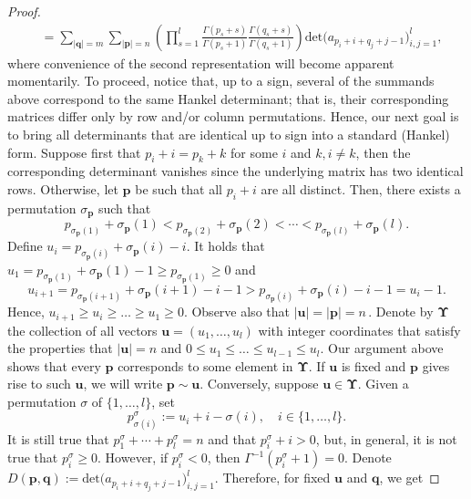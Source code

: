 \documentclass[10pt,a4paper]{amsart}
\def\ge{\geqslant}
\def\le{\leqslant}
\renewcommand{\det}{\mathrm{det}}
\begin{document}
\begin{proof}
\begin{align}
\label{wnm}
& = \sum_{|\boldsymbol q|=m}\sum_{|\boldsymbol p|=n} \left(\prod_{s=1}^l \frac{\Gamma(p_s+s)}{\Gamma(p_s+1)}\frac{\Gamma(q_s+s)}{\Gamma(q_s+1)}\right) \det\big(a_{p_i+i+q_j+j-1}\big)_{i,j=1}^l,
\end{align}
where convenience of the second representation will become apparent momentarily. To proceed,  notice that, up to a sign, several of the summands above correspond to the same Hankel determinant; that is, their corresponding matrices differ only by row and/or column permutations. Hence, our next goal is to bring all determinants that are identical up to sign into a standard (Hankel) form. Suppose first that \( p_i+i=p_k+k \) for some \( i \) and \( k, i\neq k \), then the corresponding determinant vanishes since the underlying matrix has two identical rows. Otherwise, let \( \boldsymbol p \) be such that all \( p_i+i \) are all distinct. Then, there exists a permutation \( \sigma_{\boldsymbol p} \) such that
\[
p_{\sigma_{\boldsymbol p}(1)}+\sigma_{\boldsymbol p}(1)<p_{\sigma_{\boldsymbol p}(2)}+\sigma_{\boldsymbol p}(2)< \cdots < p_{\sigma_{\boldsymbol p}(l)}+\sigma_{\boldsymbol p}(l).
\]
Define \( u_i = p_{\sigma_{\boldsymbol p}(i)}+\sigma_{\boldsymbol p}(i)-i \). It holds that \( u_1 = p_{\sigma_{\boldsymbol p}(1)}+\sigma_{\boldsymbol p}(1)-1\geq p_{\sigma_{\boldsymbol p}(1)} \geq 0 \) and
\[
u_{i+1} = p_{\sigma_{\boldsymbol p}(i+1)}+\sigma_{\boldsymbol p}(i+1)-i - 1 > p_{\sigma_{\boldsymbol p}(i)}+\sigma_{\boldsymbol p}(i)-i -1 = u_i - 1.
\]
Hence, \( u_{i+1}\geq u_i\geq \ldots \ge u_1\geq 0 \). Observe also that
$
|\boldsymbol u|=|\boldsymbol p|=n\,.
$
Denote by $\boldsymbol \Upsilon$ the collection of all vectors $\boldsymbol u=(u_1,\ldots,u_l)$ with integer coordinates that satisfy the properties that $|\boldsymbol u|=n$ and {$0\le u_1\le \ldots \le u_{l-1}\le u_{l}$.} Our argument above shows that every $\boldsymbol p$ corresponds to some element in $\boldsymbol \Upsilon$. If $\boldsymbol u$ is fixed and $\boldsymbol p$ gives rise to such $\boldsymbol u$, we will write 
\( \boldsymbol p\sim \boldsymbol u \). Conversely, suppose \( \boldsymbol u \in \boldsymbol \Upsilon\). Given a permutation \( \sigma \) of \( \{1,\ldots,l\} \), set
\[
p_{\sigma(i)}^\sigma := u_i+i-\sigma(i), \quad i\in\{1,\ldots,l\}.
\]
It is still true that \( p_1^\sigma+\cdots +p_l^\sigma = n \) and that \( p_i^\sigma+i>0 \), but, in general, it is not true that \( p_i^\sigma\geq0 \). However, if \( p_i^\sigma<0 \), then \( \Gamma^{-1}(p_i^\sigma+1)=0 \). Denote \( D(\boldsymbol p,\boldsymbol q) := \det\big(a_{p_i+i+q_j+j-1}\big)_{i,j=1}^l \). Therefore, for fixed $\boldsymbol u$ and $\boldsymbol q$, we get 

\end{proof}
\end{document}
